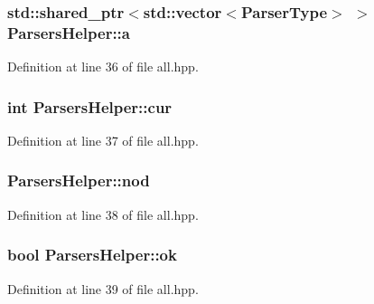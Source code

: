\subsubsection[{a}]{\setlength{\rightskip}{0pt plus 5cm}std\+::shared\+\_\+ptr$<$std\+::vector$<${\bf Parser\+Type}$>$ $>$ Parsers\+Helper\+::a\hspace{0.3cm}{\ttfamily [private]}}\label{class_parsers_helper_a1c30abdf7ce5ad7d5e67237f88f18223}


Definition at line 36 of file all.\+hpp.

\hypertarget{class_parsers_helper_a51c199f259d9aadab7d02681c9e57c49}{}
\subsubsection[{cur}]{\setlength{\rightskip}{0pt plus 5cm}int Parsers\+Helper\+::cur\hspace{0.3cm}{\ttfamily [private]}}\label{class_parsers_helper_a51c199f259d9aadab7d02681c9e57c49}


Definition at line 37 of file all.\+hpp.

\hypertarget{class_parsers_helper_a37f84842cb32827280bff1663f43d750}{}
\subsubsection[{nod}]{ Parsers\+Helper\+::nod\hspace{0.3cm}{\ttfamily [private]}}\label{class_parsers_helper_a37f84842cb32827280bff1663f43d750}


Definition at line 38 of file all.\+hpp.

\hypertarget{class_parsers_helper_a88e598a10d698b0962efa12ee6121436}{}
\subsubsection[{ok}]{\setlength{\rightskip}{0pt plus 5cm}bool Parsers\+Helper\+::ok\hspace{0.3cm}{\ttfamily [private]}}\label{class_parsers_helper_a88e598a10d698b0962efa12ee6121436}


Definition at line 39 of file all.\+hpp.

